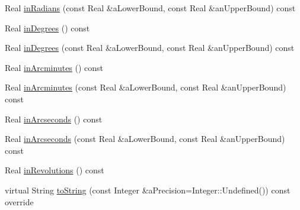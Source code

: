 \begin{DoxyCompactItemize}
\item 
Real \hyperlink{classostk_1_1physics_1_1units_1_1_angle_acaa7d6b9b7ff74854c194b554cfe94a6}{in\+Radians} (const Real \&a\+Lower\+Bound, const Real \&an\+Upper\+Bound) const
\item 
Real \hyperlink{classostk_1_1physics_1_1units_1_1_angle_ac5faeae2943418bfebdf26a641083662}{in\+Degrees} () const
\item 
Real \hyperlink{classostk_1_1physics_1_1units_1_1_angle_aa1ea48dcf3d6c11fb6317f422604a382}{in\+Degrees} (const Real \&a\+Lower\+Bound, const Real \&an\+Upper\+Bound) const
\item 
Real \hyperlink{classostk_1_1physics_1_1units_1_1_angle_a03d9c3a133d4076b6a67a0abc8d73271}{in\+Arcminutes} () const
\item 
Real \hyperlink{classostk_1_1physics_1_1units_1_1_angle_a678a42204ee95b335e30853d94b31689}{in\+Arcminutes} (const Real \&a\+Lower\+Bound, const Real \&an\+Upper\+Bound) const
\item 
Real \hyperlink{classostk_1_1physics_1_1units_1_1_angle_ae1898d207b9a0a54bec27a4abfa30db7}{in\+Arcseconds} () const
\item 
Real \hyperlink{classostk_1_1physics_1_1units_1_1_angle_a6ccbfdaeeda6aa1bb812d9bef768fb84}{in\+Arcseconds} (const Real \&a\+Lower\+Bound, const Real \&an\+Upper\+Bound) const
\item 
Real \hyperlink{classostk_1_1physics_1_1units_1_1_angle_a8e0d12ccfb07c08113f9f183272344c8}{in\+Revolutions} () const
\item 
virtual String \hyperlink{classostk_1_1physics_1_1units_1_1_angle_a7403146e01d293dfdd30130f9a9f0f2f}{to\+String} (const Integer \&a\+Precision=Integer\+::\+Undefined()) const override
\end{DoxyCompactItemize}
